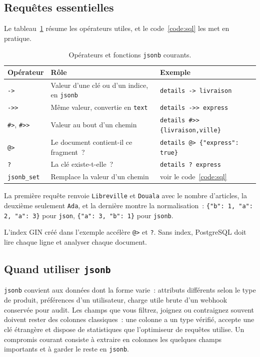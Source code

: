 \documentclass[12pt,a4paper]{article}
\newcommand{\exemple}[3][]{%
  \par\addvspace{6pt}\noindent\begin{minipage}{\linewidth}%
  \end{minipage}\par\addvspace{6pt}}
\begin{document}
\subsection{Requêtes essentielles}
Le tableau~\ref{tab:operateurs} résume les opérateurs utiles, et le code~\ref{code:sql} les met en pratique.

\begin{table}[H]
\centering
\small
\begin{tabularx}{\textwidth}{lXl}
\toprule
\textbf{Opérateur} & \textbf{Rôle} & \textbf{Exemple} \\
\midrule
\texttt{->} & Valeur d'une clé ou d'un indice, en \texttt{jsonb} & \texttt{details -> \textquotesingle{}livraison\textquotesingle{}} \\
\texttt{->{}>} & Même valeur, convertie en \texttt{text} & \texttt{details ->{}> \textquotesingle{}express\textquotesingle{}} \\
\texttt{\#>}, \texttt{\#>{}>} & Valeur au bout d'un chemin & \texttt{details \#>{}> \textquotesingle{}\{livraison,ville\}\textquotesingle{}} \\
\texttt{@>} & Le document contient-il ce fragment~? & \texttt{details @> \textquotesingle{}\{"express": true\}\textquotesingle{}} \\
\texttt{?} & La clé existe-t-elle~? & \texttt{details ? \textquotesingle{}express\textquotesingle{}} \\
\texttt{jsonb\_set} & Remplace la valeur d'un chemin & voir le code~\ref{code:sql} \\
\bottomrule
\end{tabularx}
\caption{Opérateurs et fonctions \texttt{jsonb} courants.}
\label{tab:operateurs}
\end{table}

\exemple[style=sql,label=code:sql]{sql/jsonb.sql}{Créer, interroger, indexer et modifier une colonne \texttt{jsonb}}

La première requête renvoie \texttt{Libreville} et \texttt{Douala} avec le nombre d'articles, la deuxième seulement \texttt{Ada}, et la dernière montre la normalisation~: \texttt{\{"b": 1, "a": 2, "a": 3\}} pour \texttt{json}, \texttt{\{"a": 3, "b": 1\}} pour \texttt{jsonb}.


L'index GIN créé dans l'exemple accélère \texttt{@>} et \texttt{?}. Sans index, PostgreSQL doit lire chaque ligne et analyser chaque document.

\subsection{Quand utiliser \texttt{jsonb}}
\texttt{jsonb} convient aux données dont la forme varie~: attributs différents selon le type de produit, préférences d'un utilisateur, charge utile brute d'un webhook conservée pour audit. Les champs que vous filtrez, joignez ou contraignez souvent doivent rester des colonnes classiques~: une colonne a un type vérifié, accepte une clé étrangère et dispose de statistiques que l'optimiseur de requêtes utilise. Un compromis courant consiste à extraire en colonnes les quelques champs importants et à garder le reste en \texttt{jsonb}.
\end{document}
